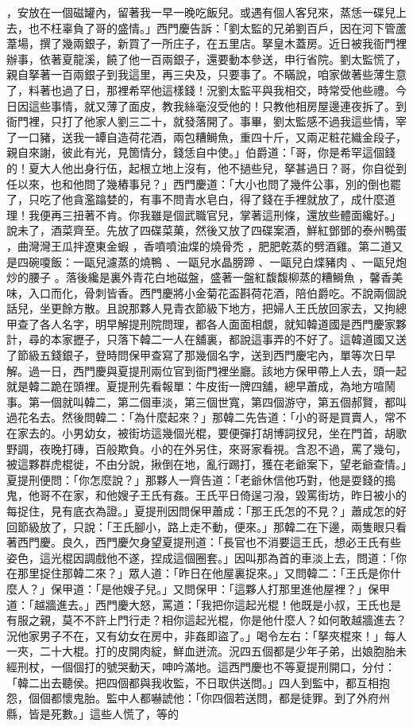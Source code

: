 \begin{showcontents}{}
，安放在一個磁罐內，留著我一早一晚吃飯兒。或遇有個人客兒來，蒸恁一碟兒上去，也不枉辜負了哥的盛情。」西門慶告訴：「劉太監的兄弟劉百戶，因在河下管蘆葦場，撰了幾兩銀子，新買了一所庄子，在五里店。拏皇木蓋房。近日被我衙門裡辦事，依著夏龍溪，饒了他一百兩銀子，還要動本參送，申行省院。劉太監慌了，親自拏著一百兩銀子到我這里，再三央及，只要事了。不瞞說，咱家做著些薄生意了，料著也過了日，那裡希罕他這樣錢！況劉太監平與我相交，時常受他些禮。今日因這些事情，就又薄了面皮，教我絲毫沒受他的！只教他相房屋邊連夜拆了。到衙門裡，只打了他家人劉三二十，就發落開了。事畢，劉太監感不過我這些情，宰了一口豬，送我一罈自造荷花酒，兩包糟鰣魚，重四十斤，又兩疋粧花織金段子，親自來謝，彼此有光，見箇情分，錢恁自中使。」伯爵道：「哥，你是希罕這個錢的！夏大人他出身行伍，起根立地上沒有，他不撾些兒，拏甚過日？哥，你自從到任以來，也和他問了幾樁事兒？」西門慶道：「大小也問了幾件公事，別的倒也罷了，只吃了他貪濫蹹婪的，有事不問青水皂白，得了錢在手裡就放了，成什麼道理！我便再三扭著不肯。你我雖是個武職官兒，掌著這刑條，還放些體面纔好。」說未了，酒菜齊至。先放了四碟菜菓，然後又放了四碟案酒，鮮紅鄧鄧的泰州鴨蛋 ，曲灣灣王瓜拌遼東金蝦 ，香噴噴油煠的燒骨禿 ，肥肥乾蒸的劈酒雞。第二道又是四碗嗄飯：一甌兒濾蒸的燒鴨 、一甌兒水晶膀蹄 、一甌兒白煠豬肉 、一甌兒炮炒的腰子 。落後纔是裏外青花白地磁盤，盛著一盤紅馥馥柳蒸的糟鰣魚 ，馨香美味，入口而化，骨刺皆香。西門慶將小金菊花盃斟荷花酒，陪伯爵吃。不說兩個說話兒，坐更餘方散。且說那夥人見青衣節級下地方，把婦人王氏放回家去，又拘總甲查了各人名字，明早解提刑院問理，都各人面面相覷，就知韓道國是西門慶家夥計，尋的本家攊子，只落下韓二一人在舖裏，都說這事弄的不好了。這韓道國又送了節級五錢銀子，登時問保甲查寫了那幾個名字，送到西門慶宅內，單等次日早解。過一日，西門慶與夏提刑兩位官到衙門裡坐廳。該地方保甲帶上人去，頭一起就是韓二跪在頭裡。夏提刑先看報單：牛皮街一牌四舖，總早蕭成，為地方喧鬧事。第一個就叫韓二，第二個車淡，第三個世寬，第四個游守，第五個郝賢，都叫過花名去。然後問韓二：「為什麼起來？」那韓二先告道：「小的哥是買賣人，常不在家去的。小男幼女，被街坊這幾個光棍，要便彈打胡博詞扠兒，坐在門首，胡歌野調，夜晚打磚，百般欺負。小的在外另住，來哥家看視。含忍不過，罵了幾句，被這夥群虎棍徙，不由分說，揪倒在地，亂行踢打，獲在老爺案下，望老爺查情。」夏提刑便問：「你怎麼說？」那夥人一齊告道：「老爺休信他巧對，他是耍錢的搗鬼，他哥不在家，和他嫂子王氏有姦。王氏平日倚逞刁潑，毀罵街坊，昨日被小的每捉住，見有底衣為證。」夏提刑因問保甲蕭成：「那王氏怎的不見？」蕭成怎的好回節級放了，只說：「王氏腳小，路上走不動，便來。」那韓二在下邊，兩隻眼只看著西門慶。良久，西門慶欠身望夏提刑道：「長官也不消要這王氏，想必王氏有些姿色，這光棍因調戲他不遂，捏成這個圈套。」因叫那為首的車淡上去，問道：「你在那里捉住那韓二來？」眾人道：「昨日在他屋裏捉來。」又問韓二：「王氏是你什麼人？」保甲道：「是他嫂子兒。」又問保甲：「這夥人打那里進他屋裡？」保甲道：「越牆進去。」西門慶大怒，罵道：「我把你這起光棍！他既是小叔，王氏也是有服之親，莫不不許上門行走？相你這起光棍，你是他什麼人？如何敢越牆進去？況他家男子不在，又有幼女在房中，非姦即盜了。」喝令左右：「拏夾棍來！」每人一夾，二十大棍。打的皮開肉綻，鮮血迸流。況四五個都是少年子弟，出娘胞胎未經刑杖，一個個打的號哭動天，呻吟滿地。這西門慶也不等夏提刑開口，分付：「韓二出去聽侯。把四個都與我收監，不日取供送問。」四人到監中，都互相抱怨，個個都懷鬼胎。監中人都嚇諕他：「你四個若送問，都是徒罪。到了外府州縣，皆是死數。」這些人慌了，等的
\end{showcontents}
